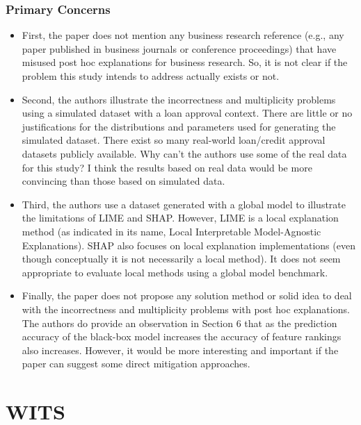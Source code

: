 \documentclass{article} %
\begin{document}
 \subsubsection{Primary Concerns}
 \begin{itemize}
    \item First, the paper does not mention any business research reference (e.g., any paper published in business journals or conference proceedings) that have misused post hoc explanations for business research. So, it is not clear if the problem this study intends to address actually exists or not.
    \item Second, the authors illustrate the incorrectness and multiplicity problems using a simulated dataset with a loan approval context. There are little or no justifications for the distributions and parameters used for generating the simulated dataset. There exist so many real-world loan/credit approval datasets publicly available. Why can’t the authors use some of the real data for this study? I think the results based on real data would be more convincing than those based on simulated data.

    \item Third, the authors use a dataset generated with a global model to illustrate the limitations of LIME and SHAP. However, LIME is a local explanation method (as indicated in its name, Local Interpretable Model-Agnostic Explanations). SHAP also focuses on local explanation implementations (even though conceptually it is not necessarily a local method). It does not seem appropriate to evaluate local methods using a global model benchmark.

    \item Finally, the paper does not propose any solution method or solid idea to deal with the incorrectness and multiplicity problems with post hoc explanations. The authors do provide an observation in Section 6 that as the prediction accuracy of the black-box model increases the accuracy of feature rankings also increases. However, it would be more interesting and important if the paper can suggest some direct mitigation approaches.
 \end{itemize}

\section{WITS}
\end{document}
